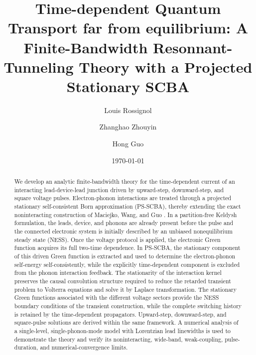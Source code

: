 \documentclass[
 reprint,
 superscriptaddress,
 amsmath,amssymb,
 aps,prb,
 longbibliography,
 floatfix
]{revtex4-2}
\begin{document}
\title{Time-dependent Quantum Transport far from equilibrium: A Finite-Bandwidth Resonnant-Tunneling Theory with a Projected Stationary SCBA}

\author{Louis Rossignol}
\author{Zhanghao Zhouyin}
\author{Hong Guo}

\date{\today}


\begin{abstract}
We develop an analytic finite-bandwidth theory for the time-dependent current of an interacting lead-device-lead junction driven by upward-step, downward-step, and square voltage pulses. Electron-phonon interactions are treated through a projected stationary self-consistent Born approximation (PS-SCBA), thereby extending the exact noninteracting construction of Maciejko, Wang, and Guo \cite{MaciejkoWangGuo2006}. In a partition-free Keldysh formulation, the leads, device, and phonons are already present before the pulse and the connected electronic system is initially described by an unbiased nonequilibrium steady state (NESS). Once the voltage protocol is applied, the electronic Green function acquires its full two-time dependence. In PS-SCBA, the stationary component of this driven Green function is extracted and used to determine the electron-phonon self-energy self-consistently, while the explicitly time-dependent component is excluded from the phonon interaction feedback. The stationarity of the interaction kernel preserves the causal convolution structure required to reduce the retarded transient problem to Volterra equations and solve it by Laplace transformation. The stationary Green functions associated with the different voltage sectors provide the NESS boundary conditions of the transient construction, while the complete switching history is retained by the time-dependent propagators. Upward-step, downward-step, and square-pulse solutions are derived within the same framework. A numerical analysis of a single-level, single-phonon-mode model with Lorentzian lead linewidths is used to demonstrate the theory and verify its noninteracting, wide-band, weak-coupling, pulse-duration, and numerical-convergence limits.
\end{abstract}
\end{document}

